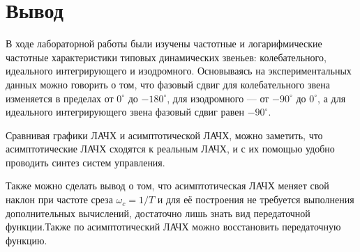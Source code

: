 \documentclass[12pt,a4paper]{article}
\begin{document}
\newpage
\section*{Вывод}
В ходе лабораторной работы были изучены частотные и логарифмические частотные характеристики типовых динамических звеньев: колебательного, идеального интегрирующего и изодромного.
Основываясь на экспериментальных данных можно говорить о том, что фазовый сдвиг для колебательного звена изменяется в пределах от $0^{\circ}$ до $-180^{\circ}$, для изодромного --- от $-90^{\circ}$ до $0^{\circ}$, а для идеального интегрирующего звена фазовый сдвиг равен $-90^{\circ}$.\par
Сравнивая графики ЛАЧХ и асимптотической ЛАЧХ, можно заметить, что асимптотические ЛАЧХ сходятся к реальным ЛАЧХ, и с их помощью удобно проводить синтез систем управления.\par
Также можно сделать вывод о том, что асимптотическая ЛАЧХ меняет свой наклон при частоте среза $\omega_c = 1/T$ и для её построения не требуется выполнения дополнительных вычислений, достаточно лишь знать вид передаточной функции.Также по асимптотический ЛАЧХ можно восстановить передаточную функцию.  
\end{document}
